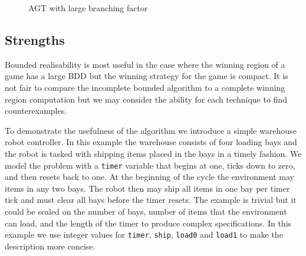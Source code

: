 \begin{figure}
    \caption{AGT with large branching factor}
    \label{fig:limitationexample}
\end{figure}

\subsection{Strengths}

Bounded realisability is most useful in the case where the winning region of a game has a large BDD but the winning strategy for the game is compact. It is not fair to compare the incomplete bounded algorithm to a complete winning region computation but we may consider the ability for each technique to find counterexamples. 

To demonstrate the usefulness of the algorithm we introduce a simple warehouse robot controller. In this example the warehouse consists of four loading bays and the robot is tasked with shipping items placed in the bays in a timely fashion. We model the problem with a \texttt{timer} variable that begins at one, ticks down to zero, and then resets back to one. At the beginning of the cycle the environment may items in any two bays. The robot then may ship all items in one bay per timer tick and must clear all bays before the timer resets. The example is trivial but it could be scaled on the number of bays, number of items that the environment can load, and the length of the timer to produce complex specifications. In this example we use integer values for \texttt{timer}, \texttt{ship}, \texttt{load0} and \texttt{load1} to make the description more concise.


